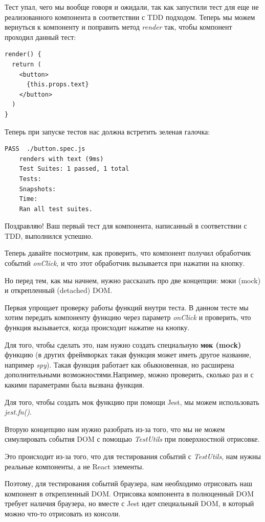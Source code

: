 Тест упал, чего мы вообще говоря и ожидали, так как запустили тест для еще не реализованного компонента в соответствии с TDD подходом. Теперь мы можем вернуться к компоненту и поправить метод \textit{render} так, чтобы компонент проходил данный тест:

\begin{lstlisting}
render() {
  return (
    <button>
      {this.props.text}
    </button>
  )
}
\end{lstlisting}

Теперь при запуске тестов нас должна встретить зеленая галочка:

\begin{lstlisting}
PASS  ./button.spec.js
    renders with text (9ms)
    Test Suites: 1 passed, 1 total
    Tests:
    Snapshots:
    Time:
    Ran all test suites.
\end{lstlisting}

Поздравляю! Ваш первый тест для компонента, написанный в соответствии с TDD, выполнился успешно.

Теперь давайте посмотрим, как проверить, что компонент получил обработчик событий \textit{onClick}, и что этот обработчик вызывается при нажатии на кнопку.

Но перед тем, как мы начнем, нужно рассказать про две концепции: моки (mock) и открепленный (detached) DOM.

Первая упрощает проверку работы функций внутри теста. В данном тесте мы хотим передать компоненту функцию через параметр \textit{onClick} и проверить, что функция вызывается, когда происходит нажатие на кнопку.

Для того, чтобы сделать это, нам нужно создать специальную \textbf{мок (mock)} функцию (в других фреймворках такая функция может иметь другое название, например \textit{spy}). Такая функция работает как обыкновенная, но расширена дополнительными возможностями.Например, можно проверить, сколько раз и с какими параметрами была вызвана функция.

Для того, чтобы создать мок функцию при помощи Jest, мы можем использовать \textit{jest.fn()}.

Вторую концепцию нам нужно разобрать из-за того, что мы не можем симулировать события DOM с помощью \textit{TestUtils} при поверхностной отрисовке.

Это происходит из-за того, что для тестирования событий с \textit{TestUtils}, нам нужны реальные компоненты, а не React элементы.

Поэтому, для тестирования событий браузера, нам необходимо отрисовать наш компонент в открепленный DOM. Отрисовка компонента в полноценный DOM требует наличия браузера, но вместе с Jest идет специальный DOM, в который можно что-то отрисовать из консоли.

